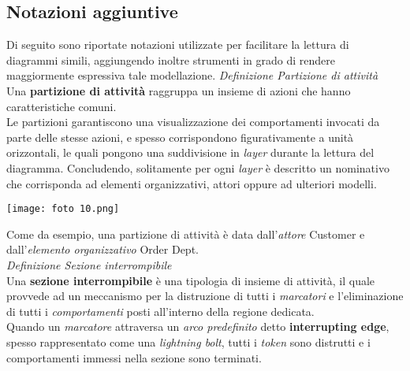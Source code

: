 \documentclass{article}
\begin{document}
\subsection*{Notazioni aggiuntive}
\large
Di seguito sono riportate notazioni utilizzate per facilitare la lettura di diagrammi simili, aggiungendo inoltre strumenti in grado di rendere maggiormente espressiva tale modellazione.\vspace*{14pt}
\textit{Definizione Partizione di attività}\\Una \textbf{partizione di attività} raggruppa un insieme di azioni che hanno caratteristiche comuni.\vspace*{14pt}\\
Le partizioni garantiscono una visualizzazione dei comportamenti invocati da parte delle stesse azioni, e spesso corrispondono figurativamente a unità orizzontali, le quali pongono una suddivisione in \textit{layer} durante la lettura del diagramma. Concludendo, solitamente per ogni \textit{layer} è descritto un nominativo che corrisponda ad elementi organizzativi, attori oppure ad ulteriori modelli.\\
\begin{center}
    \texttt{[image: foto 10.png]}
\end{center} 
Come da esempio, una partizione di attività è data dall'\textit{attore} Customer e dall'\textit{elemento organizzativo} Order Dept.\vspace*{14pt}\\
\textit{Definizione Sezione interrompibile}\\Una \textbf{sezione interrompibile} è una tipologia di insieme di attività, il quale provvede ad un meccanismo per la distruzione di tutti i \textit{marcatori} e l'eliminazione di tutti i \textit{comportamenti} posti all'interno della regione dedicata. \vspace*{14pt}\\
Quando un \textit{marcatore} attraversa un \textit{arco predefinito} detto \textbf{interrupting edge}, spesso rappresentato come una \textit{lightning bolt}, tutti i \textit{token} sono distrutti e i comportamenti immessi nella sezione sono terminati.
\end{document}

